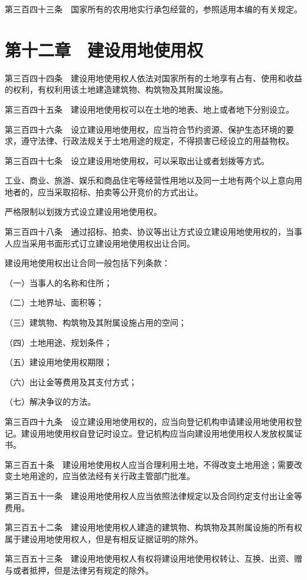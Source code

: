 \documentclass[UTF8,12pt,a4paper]{ctexbook}
\begin{document}
第三百四十三条　国家所有的农用地实行承包经营的，参照适用本编的有关规定。

\section*{第十二章　建设用地使用权}

第三百四十四条　建设用地使用权人依法对国家所有的土地享有占有、使用和收益的权利，有权利用该土地建造建筑物、构筑物及其附属设施。

第三百四十五条　建设用地使用权可以在土地的地表、地上或者地下分别设立。

第三百四十六条　设立建设用地使用权，应当符合节约资源、保护生态环境的要求，遵守法律、行政法规关于土地用途的规定，不得损害已经设立的用益物权。

第三百四十七条　设立建设用地使用权，可以采取出让或者划拨等方式。

工业、商业、旅游、娱乐和商品住宅等经营性用地以及同一土地有两个以上意向用地者的，应当采取招标、拍卖等公开竞价的方式出让。

严格限制以划拨方式设立建设用地使用权。

第三百四十八条　通过招标、拍卖、协议等出让方式设立建设用地使用权的，当事人应当采用书面形式订立建设用地使用权出让合同。

建设用地使用权出让合同一般包括下列条款：

（一）当事人的名称和住所；

（二）土地界址、面积等；

（三）建筑物、构筑物及其附属设施占用的空间；

（四）土地用途、规划条件；

（五）建设用地使用权期限；

（六）出让金等费用及其支付方式；

（七）解决争议的方法。

第三百四十九条　设立建设用地使用权的，应当向登记机构申请建设用地使用权登记。建设用地使用权自登记时设立。登记机构应当向建设用地使用权人发放权属证书。

第三百五十条　建设用地使用权人应当合理利用土地，不得改变土地用途；需要改变土地用途的，应当依法经有关行政主管部门批准。

第三百五十一条　建设用地使用权人应当依照法律规定以及合同约定支付出让金等费用。

第三百五十二条　建设用地使用权人建造的建筑物、构筑物及其附属设施的所有权属于建设用地使用权人，但是有相反证据证明的除外。

第三百五十三条　建设用地使用权人有权将建设用地使用权转让、互换、出资、赠与或者抵押，但是法律另有规定的除外。
\end{document}

